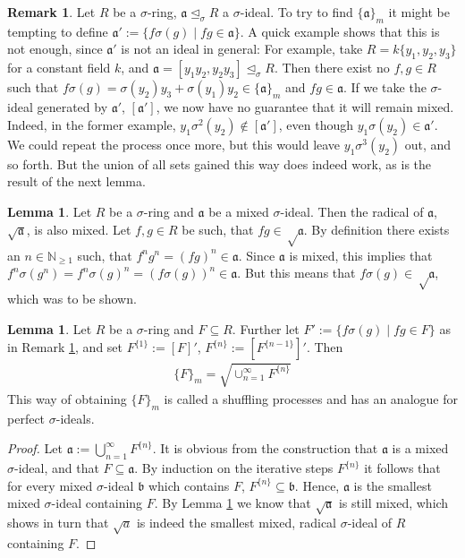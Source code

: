 \documentclass{article}
\def\NE{\mathbb{N}_{\geq1}}
\def\a{\mathfrak{a}}
\def\b{\mathfrak{b}}
\def\s{\sigma}
\def\si{\unlhd_{\sigma}}
\theoremstyle{definition}
\newtheorem{rem}[Satz]{Remark}
\newtheorem{lem}[Satz]{Lemma}
\begin{document}
\begin{rem}\label{remshuffling}
Let $R$ be a $\s$-ring, $\a \si R$ a $\s$-ideal. To try to find $\{\a\}_m$ it might be tempting to define $\a':= \{ f\s(g) \mid fg \in \a \}$. A quick example shows that this is not enough, since $\a'$ is not an ideal in general: 
For example, take $R=k\{y_1,y_2,y_3\}$ for a constant field $k$, and $\a = [y_1y_2, y_2y_3] \si R$. Then there exist no $f,g \in R$ such that $ f \s(g) = \s(y_2)y_3 + \s(y_1)y_2 \in \{\a\}_m$ and $fg \in \a$. 
If we take the $\s$-ideal generated by $\a'$, $[\a']$, we now have no guarantee that it will remain mixed. Indeed, in the former example, $y_1\s^2(y_2) \notin [\a']$, even though $y_1 \s(y_2) \in \a'$. We could repeat the process once more,
 but this would leave $y_1 \s^3(y_2)$ out, and so forth. But the union of all sets gained this way does indeed work, as is the result of the next lemma.
\end{rem}

\begin{lem}\label{sqrtmixed}
Let $R$ be a $\s$-ring and $\a$ be a mixed $\s$-ideal. Then the radical of $\a$, $\sqrt{\a}$, is also mixed.
Let $f,g \in R$ be such, that $fg \in \sqrt \a$. By definition there exists an $n \in \NE$ such, that $f^n g^n = (fg)^n \in \a$. Since $\a$ is mixed, this implies that $f^n \s(g^n) = f^n \s(g)^n = (f\s(g))^n \in \a$. 
But this means that $f\s(g) \in \sqrt \a$, which was to be shown.
\end{lem}

\begin{lem}\label{lemsuffling}
Let $R$ be a $\s$-ring and $F \subseteq R$. Further let $F' := \{f\s(g) \mid fg \in F \}$ as in Remark \ref{remshuffling}, and set $F^{\{1\}}:= [F]'$, $F^{\{n\}}:= [F^{\{n-1\}}]'$. Then
\begin{align} \{F\}_m = \sqrt{\cup_{n=1}^{\infty} F^{\{n\}}} \end{align}
This way of obtaining $\{F\}_m$ is called a shuffling processes and has an analogue for perfect $\s$-ideals. 
\begin{proof}
Let $\a:= \bigcup_{n=1}^{\infty} F^{\{n\}}$. It is obvious from the construction that $\a$ is a mixed $\s$-ideal, and that $F \subseteq \a$. 
By induction on the iterative steps $F^{\{n\}}$ it follows that for every mixed $\s$-ideal $\b$ which contains $F$, $F^{\{n\}} \subseteq \b$. Hence, $\a$ is the smallest mixed $\s$-ideal containing $F$.
By Lemma \ref{sqrtmixed} we know that $\sqrt{\a}$ is still mixed, which shows in turn that $\sqrt a$ is indeed the smallest mixed, radical $\s$-ideal of $R$ containing $F$. 
\end{proof}
\end{lem}
\end{document}
